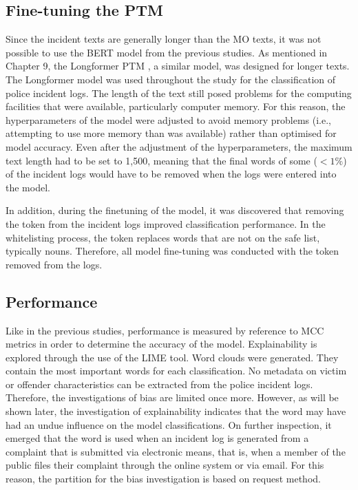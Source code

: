 \subsection{Fine-tuning the PTM} Since the incident texts are generally longer than the MO texts, it was not possible to use the BERT model from the previous studies. As mentioned in Chapter 9, the Longformer PTM \parencite{beltagy2020longformer}, a similar model, was designed for longer texts. The Longformer model was used throughout the study for the classification of police incident logs. The length of the text still posed problems for the computing facilities that were available, particularly computer memory. For this reason, the hyperparameters of the model were adjusted to avoid memory problems (i.e., attempting to use more memory than was available) rather than optimised for model accuracy. Even after the adjustment of the hyperparameters, the maximum text length had to be set to 1,500, meaning that the final words of some ($<1\%$) of the incident logs would have to be removed when the logs were entered into the model.

In addition, during the finetuning of the model, it was discovered that removing the  token from the incident logs improved classification performance. In the whitelisting process, the   token replaces words that are not on the safe list, typically nouns. Therefore, all model fine-tuning was conducted with the   token removed from the logs.

\subsection{Performance} Like in the previous studies, performance is measured by reference to MCC metrics in order to determine the accuracy of the model. Explainability is explored through the use of the LIME tool. Word clouds were generated. They contain the most important words for each classification.
No metadata on victim or offender characteristics can be extracted from the police incident logs. Therefore, the investigations of bias are limited once more. However, as will be shown later, the investigation of explainability indicates that the word  may have had an undue influence on the model classifications. On further inspection, it emerged that the word  is used when an incident log is generated from a complaint that is submitted via electronic means, that is, when a member of the public files their complaint through the online system or via email. For this reason, the partition for the bias investigation is based on request method.

